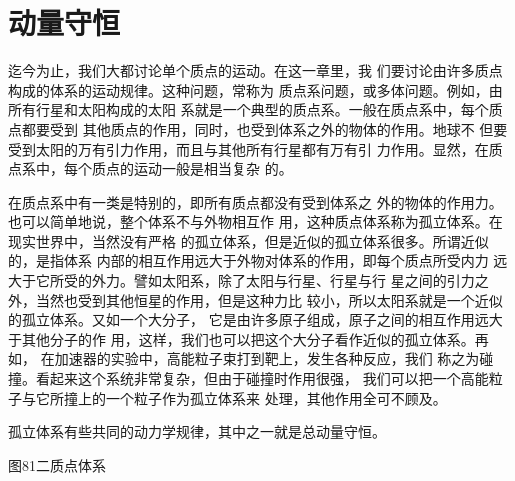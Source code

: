 \section{动量守恒}\label{sec:08.01}

迄今为止，我们大都讨论单个质点的运动。在这一章里，我
们要讨论由许多质点构成的体系的运动规律。这种问题，常称为
质点系问题，或多体问题。例如，由所有行星和太阳构成的太阳
系就是一个典型的质点系。一般在质点系中，每个质点都要受到
其他质点的作用，同时，也受到体系之外的物体的作用。地球不
但要受到太阳的万有引力作用，而且与其他所有行星都有万有引
力作用。显然，在质点系中，每个质点的运动一般是相当复杂
的。

在质点系中有一类是特别的，即所有质点都没有受到体系之
外的物体的作用力。也可以简单地说，整个体系不与外物相互作
用，这种质点体系称为孤立体系。在现实世界中，当然没有严格
的孤立体系，但是近似的孤立体系很多。所谓近似的，是指体系
内部的相互作用远大于外物对体系的作用，即每个质点所受内力
远大于它所受的外力。譬如太阳系，除了太阳与行星、行星与行
星之间的引力之外，当然也受到其他恒星的作用，但是这种力比
较小，所以太阳系就是一个近似的孤立体系。又如一个大分子，
它是由许多原子组成，原子之间的相互作用远大于其他分子的作
用，这样，我们也可以把这个大分子看作近似的孤立体系。再如，
在加速器的实验中，高能粒子束打到靶上，发生各种反应，我们
称之为碰撞。看起来这个系统非常复杂，但由于碰撞时作用很强，
我们可以把一个高能粒子与它所撞上的一个粒子作为孤立体系来
处理，其他作用全可不顾及。

孤立体系有些共同的动力学规律，其中之一就是总动量守恒。

图81二质点体系

